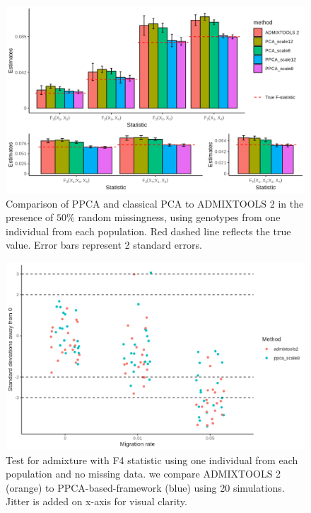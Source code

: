 \documentclass[12pt]{article}
\begin{document}
\begin{figure}[ht!]
    \includegraphics[width=16.5cm]{Images/ppca/Figures/mu0.05_plot_all_1ind_missing.png}
    \centering
    \caption{Comparison of PPCA and classical PCA to ADMIXTOOLS 2 in the presence of $50\%$ random missingness, using genotypes from one individual from each population. Red dashed line reflects the true value. Error bars represent 2 standard errors.}
    \label{fig:comparison-adm}
\end{figure}

\begin{figure}[ht!]
    \includegraphics[width=16.5cm]{Images/ppca/Supplement/hypothesis_test_comparison.png}
    \centering
    \caption{Test for admixture with F4 statistic using one individual from each population and no missing data. we compare ADMIXTOOLS 2 (orange) to PPCA-based-framework (blue) using 20 simulations. Jitter is added on x-axis for visual clarity.}
    \label{figS7:test}
\end{figure}
\end{document}
